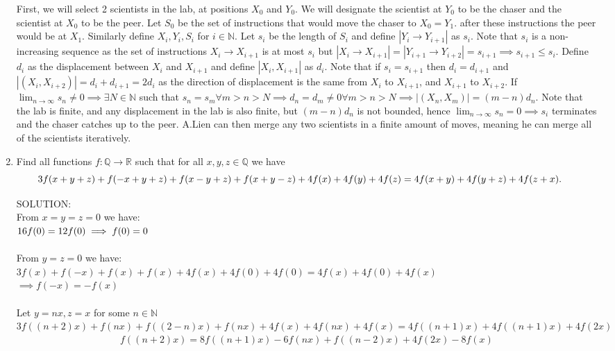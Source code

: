 \documentclass{article}
\begin{document}
\begin{enumerate}[1.]
First, we will select 2 scientists in the lab, at positions $X_0$ and $Y_0$. We will designate the scientist at $Y_0$ to be the chaser and the scientist at $X_0$ to be the peer. Let $S_0$ be the set of instructions that would move the chaser to $X_0 = Y_1$. after these instructions the peer would be at $X_1$. Similarly define $X_i,Y_i,S_i $ for $i\in\mathbb{N}$. Let $s_i$ be the length of $S_i$ and define $|Y_{i}\to Y_{i+1}|$ as $s_i$. Note that $s_i$ is a non-increasing sequence as the set of instructions $X_{i}\to X_{i+1}$ is at most $s_i$ but $|X_{i}\to X_{i+1}| = |Y_{i+1}\to Y_{i+2}| = s_{i+1} \implies s_{i+1}\leq s_{i}.$ Define $d_i$ as the displacement between $X_{i}$ and $X_{i+1}$ and define $|X_{i},X_{i+1}|$ as $d_{i}$. Note that if $s_i = s_{i+1}$ then $d_i = d_{i+1}$ and $|(X_{i},X_{i+2})| = d_i + d_{i+1} = 2d_{i}$ as the direction of displacement is the same from $X_i$ to $X_{i+1}$, and $X_{i+1}$ to $X_{i+2}$. If $\lim_{n\to\infty} s_n \neq 0 \implies \exists N \in \mathbb{N}$ such that $s_n = s_m\forall m>n>N \implies d_n = d_m \neq 0 \forall m>n>N \implies |(X_{n},X_{m})| = (m-n)d_n$. Note that the lab is finite, and any displacement in the lab is also finite, but $(m-n)d_n$ is not bounded, hence $\lim_{n\to\infty}s_n = 0 \implies s_i$ terminates and the chaser catches up to the peer. A.Lien can then merge any two scientists in a finite amount of moves, meaning he can merge all of the scientists iteratively.      


\vfill
\item %
Find all functions $f : \mathbb{Q} \to \mathbb{R}$ such that for all $x, y, z \in \mathbb{Q}$ we have
\[ \mspace{-24mu} 3f(x+y+z) +f(-x+y+z) +f(x-y+z) +f(x+y-z) +4f(x) +4f(y) +4f(z) = 4f(x+y) +4f(y+z) +4f(z+x). \]

SOLUTION:\\

From $x=y=z=0$ we have:
\\$16f(0) = 12f(0) \\\implies f(0) = 0$
\\\\From $y=z=0$ we have:
\\$3f(x) + f(-x) + f(x) + f(x) + 4f(x) + 4f(0) + 4f(0) = 4f(x) + 4f(0) + 4f(x)$
\\$\implies f(-x) = -f(x)$
\\\\Let $y=nx, z=x$ for some $n \in \mathbb{N}$
\\$3f((n+2)x) + f(nx) + f((2-n)x) + f(nx) + 4f(x) + 4f(nx) + 4f(x) = 4f((n+1)x) + 4f((n+1)x) + 4f(2x)$
\begin{align}
f((n+2)x) = 8f((n+1)x) -6f(nx) + f((n-2)x) +4f(2x) - 8f(x)
\end{align}


\end{enumerate}
\end{document}
